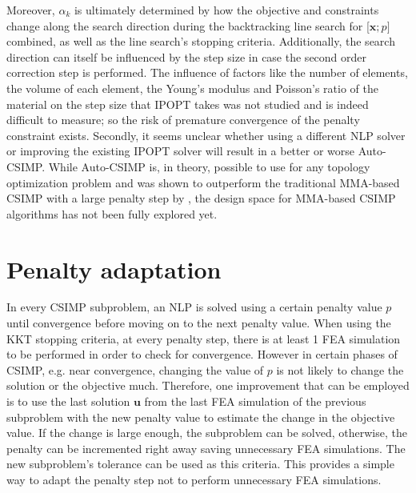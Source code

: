   Moreover, $\alpha_k$ is ultimately determined by how the objective and constraints change along the search direction during the backtracking line search for [$\bm{x}; p]$ combined, as well as the line search's stopping criteria. Additionally, the search direction can itself be influenced by the step size in case the second order correction step is performed. The influence of factors like the number of elements, the volume of each element, the Young's modulus and Poisson's ratio of the material on the step size that IPOPT takes was not studied and is indeed difficult to measure; so the risk of premature convergence of the penalty constraint exists. Secondly, it seems unclear whether using a different NLP solver or improving the existing IPOPT solver will result in a better or worse Auto-CSIMP. While Auto-CSIMP is, in theory, possible to use for any topology optimization problem and was shown to outperform the traditional MMA-based CSIMP with a large penalty step by \cite{Rojas-Labanda2015}, the design space for MMA-based CSIMP algorithms has not been fully explored yet.

\section{Penalty adaptation} \label{sec:adaptive_penalty}

  In every CSIMP subproblem, an NLP is solved using a certain penalty value $p$ until convergence before moving on to the next penalty value. When using the KKT stopping criteria, at every penalty step, there is at least 1 FEA simulation to be performed in order to check for convergence. However in certain phases of CSIMP, e.g. near convergence, changing the value of $p$ is not likely to change the solution or the objective much. Therefore, one improvement that can be employed is to use the last solution $\bm{u}$ from the last FEA simulation of the previous subproblem with the new penalty value to estimate the change in the objective value. If the change is large enough, the subproblem can be solved, otherwise, the penalty can be incremented right away saving unnecessary FEA simulations. The new subproblem's tolerance can be used as this criteria. This provides a simple way to adapt the penalty step not to perform unnecessary FEA simulations. 

